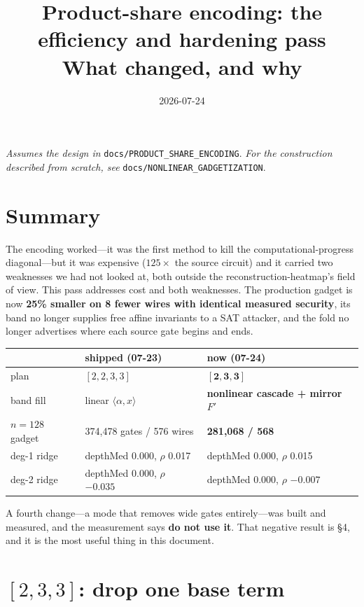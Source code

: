 \documentclass[11pt]{article}
\title{\textbf{Product-share encoding: the efficiency and hardening pass}\\[2pt]
\large What changed, and why}
\author{}
\date{2026-07-24}
\begin{document}
\maketitle

\noindent\emph{Assumes the design in} \texttt{docs/PRODUCT\_SHARE\_ENCODING}.
\emph{For the construction described from scratch, see}
\texttt{docs/NONLINEAR\_GADGETIZATION}.

\section{Summary}

The encoding worked---it was the first method to kill the computational-progress
diagonal---but it was expensive ($125\times$ the source circuit) and it carried
two weaknesses we had not looked at, both outside the reconstruction-heatmap's
field of view. This pass addresses cost and both weaknesses. The production
gadget is now \textbf{25\% smaller on 8 fewer wires with identical measured
security}, its band no longer supplies free affine invariants to a SAT attacker,
and the fold no longer advertises where each source gate begins and ends.

\begin{center}
\begin{tabular}{lll}
\toprule
 & shipped (07-23) & now (07-24) \\
\midrule
plan & $[2,2,3,3]$ & $\mathbf{[2,3,3]}$ \\
band fill & linear $\langle\alpha,x\rangle$ & \textbf{nonlinear cascade + mirror $F'$} \\
$n{=}128$ gadget & 374{,}478 gates / 576 wires & \textbf{281{,}068 / 568} \\
deg-1 ridge & depthMed 0.000, $\rho$ 0.017 & depthMed 0.000, $\rho$ 0.015 \\
deg-2 ridge & depthMed 0.000, $\rho$ $-0.035$ & depthMed 0.000, $\rho$ $-0.007$ \\
\bottomrule
\end{tabular}
\end{center}

A fourth change---a mode that removes wide gates entirely---was built and
measured, and the measurement says \textbf{do not use it}. That negative result
is \S4, and it is the most useful thing in this document.

\section{$[2,3,3]$: drop one base term}
\end{document}
